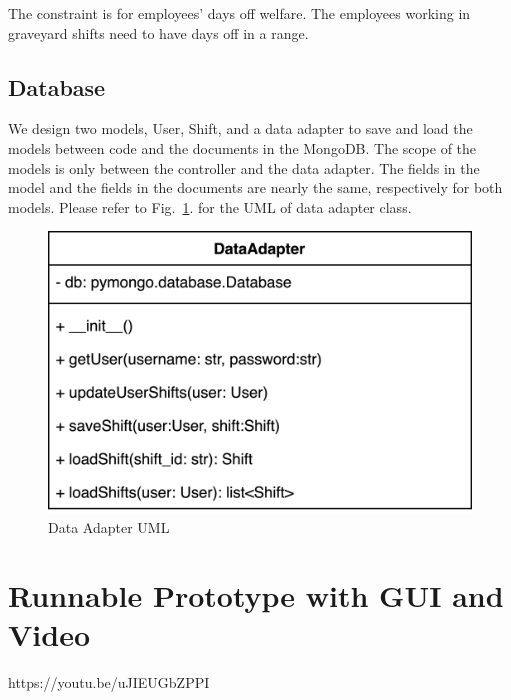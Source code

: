 \documentclass[11pt, oneside]{article}   	%
\begin{document}
The constraint is for employees' days off welfare. The employees working in graveyard shifts need to have days off in a range.


\subsection{Database}
We design two models, User, Shift, and a data adapter to save and load the models between code and the documents in the MongoDB. The scope of the models is only between the controller and the data adapter. The fields in the model and the fields in the documents are nearly the same, respectively for both models. Please refer to Fig.~\ref{dataadapteruml}. for the UML of data adapter class.
\begin{figure}
\centering
\includegraphics[scale=0.05]{dataadapter}
\caption{Data Adapter UML}
\label{dataadapteruml}
\end{figure}

\section{Runnable Prototype with GUI and Video}
https://youtu.be/uJIEUGbZPPI
\end{document}
